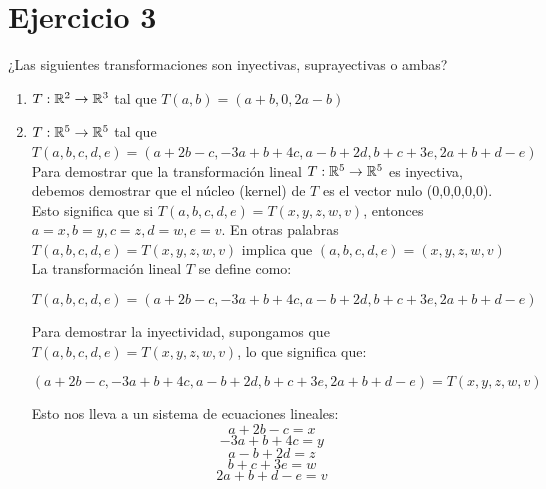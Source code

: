 \section*{Ejercicio 3}

¿Las siguientes transformaciones son inyectivas, suprayectivas o ambas?

\begin{enumerate}
    \item $T: \mathbb{R}^{2} \rightarrow \mathbb{R}^{3}$ tal que $T(a,b) = (a + b, 0, 2a - b)$



    \item $T: \mathbb{R}^{5} \rightarrow \mathbb{R}^{5}$ tal que $T(a,b,c,d,e)  = (a + 2b -c, -3a + b + 4c, a - b + 2d, b + c +3e, 2a + b + d - e)$\\


      Para demostrar que la transformación lineal $T: \mathbb{R}^{5} \rightarrow \mathbb{R}^{5}$ es inyectiva, debemos demostrar
      que el núcleo (kernel) de $T$ es el vector nulo (0,0,0,0,0). Esto significa que si $T(a,b,c,d,e) = T(x,y,z,w,v)$,
      entonces $a = x, b = y, c = z, d = w, e = v$. En otras palabras $T(a,b,c,d,e) = T(x,y,z,w,v)$ implica que 
      $(a,b,c,d,e) = (x,y,z,w,v)$\\

      La transformación lineal $T$ se define como:

      \begin{equation*}
            T(a,b,c,d,e)  = (a + 2b -c, -3a + b + 4c, a - b + 2d, b + c +3e, 2a + b + d - e)
      \end{equation*}

      Para demostrar la inyectividad, supongamos que $T(a,b,c,d,e) = T(x,y,z,w,v)$, lo que significa que:

      \begin{equation*}
            (a + 2b -c, -3a + b + 4c, a - b + 2d, b + c + 3e, 2a + b + d - e) = T(x,y,z,w,v) 
      \end{equation*}

      Esto nos lleva a un sistema de ecuaciones lineales: 
      \begin{equation}
            a + 2b -c = x \tag{3.1} \label{ec3.1}
      \end{equation}
      \begin{equation*}
            -3a + b + 4c = y \tag{3.2} \label{ec3.2}
      \end{equation*}
      \begin{equation}
            a - b + 2d = z \tag{3.3} \label{ec3.3}
      \end{equation}
      \begin{equation}
            b + c + 3e = w \tag{3.4} \label{ec3.4}
      \end{equation}
      \begin{equation}
            2a + b + d - e = v \tag{3.5} \label{ec3.5} 
      \end{equation}


\end{enumerate}
